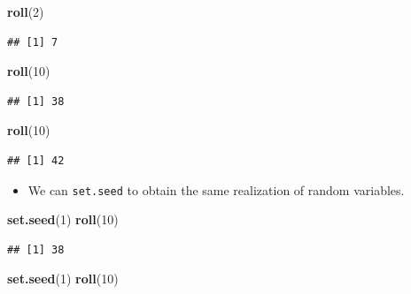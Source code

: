 \documentclass[]{book}
\newenvironment{Shaded}{\begin{snugshade}}{\end{snugshade}}
\newcommand{\KeywordTok}[1]{\textcolor[rgb]{0.13,0.29,0.53}{\textbf{#1}}}
\newcommand{\DecValTok}[1]{\textcolor[rgb]{0.00,0.00,0.81}{#1}}
\newcommand{\NormalTok}[1]{#1}
\providecommand{\tightlist}{%
  \setlength{\itemsep}{0pt}\setlength{\parskip}{0pt}}
\begin{document}
\begin{Shaded}
\begin{Highlighting}[]
\KeywordTok{roll}\NormalTok{(}\DecValTok{2}\NormalTok{)}
\end{Highlighting}
\end{Shaded}

\begin{verbatim}
## [1] 7
\end{verbatim}

\begin{Shaded}
\begin{Highlighting}[]
\KeywordTok{roll}\NormalTok{(}\DecValTok{10}\NormalTok{)}
\end{Highlighting}
\end{Shaded}

\begin{verbatim}
## [1] 38
\end{verbatim}

\begin{Shaded}
\begin{Highlighting}[]
\KeywordTok{roll}\NormalTok{(}\DecValTok{10}\NormalTok{)}
\end{Highlighting}
\end{Shaded}

\begin{verbatim}
## [1] 42
\end{verbatim}

\begin{itemize}
\tightlist
\item
  We can \texttt{set.seed} to obtain the same realization of random
  variables.
\end{itemize}

\begin{Shaded}
\begin{Highlighting}[]
\KeywordTok{set.seed}\NormalTok{(}\DecValTok{1}\NormalTok{)}
\KeywordTok{roll}\NormalTok{(}\DecValTok{10}\NormalTok{)}
\end{Highlighting}
\end{Shaded}

\begin{verbatim}
## [1] 38
\end{verbatim}

\begin{Shaded}
\begin{Highlighting}[]
\KeywordTok{set.seed}\NormalTok{(}\DecValTok{1}\NormalTok{)}
\KeywordTok{roll}\NormalTok{(}\DecValTok{10}\NormalTok{)}
\end{Highlighting}
\end{Shaded}
\end{document}
